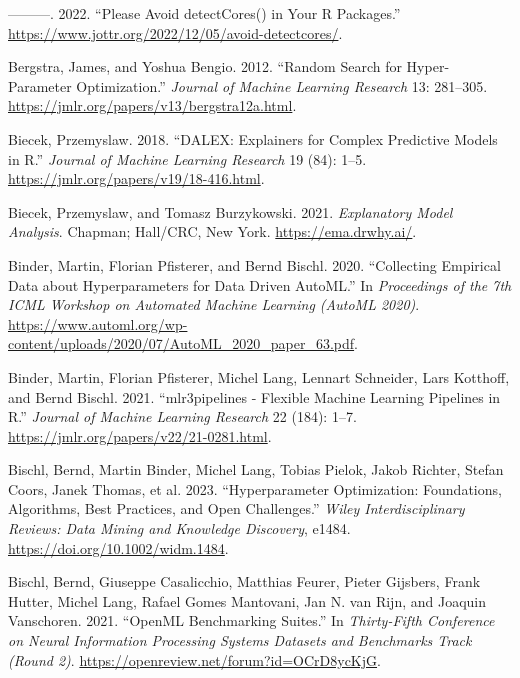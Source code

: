 \begin{CSLReferences}{1}{0}
\leavevmode{}%
---------. 2022. {``Please Avoid detectCores() in Your {R} Packages.''}
\url{https://www.jottr.org/2022/12/05/avoid-detectcores/}.

\leavevmode{}%
Bergstra, James, and Yoshua Bengio. 2012. {``Random Search for
Hyper-Parameter Optimization.''} \emph{Journal of Machine Learning
Research} 13: 281--305.
\url{https://jmlr.org/papers/v13/bergstra12a.html}.

\leavevmode{}%
Biecek, Przemyslaw. 2018. {``{DALEX}: Explainers for Complex Predictive
Models in {R}.''} \emph{Journal of Machine Learning Research} 19 (84):
1--5. \url{https://jmlr.org/papers/v19/18-416.html}.

\leavevmode{}%
Biecek, Przemyslaw, and Tomasz Burzykowski. 2021. \emph{Explanatory
Model Analysis}. Chapman; Hall/CRC, New York.
\url{https://ema.drwhy.ai/}.

\leavevmode{}%
Binder, Martin, Florian Pfisterer, and Bernd Bischl. 2020. {``Collecting
Empirical Data about Hyperparameters for Data Driven AutoML.''} In
\emph{Proceedings of the 7th ICML Workshop on Automated Machine Learning
(AutoML 2020)}.
\url{https://www.automl.org/wp-content/uploads/2020/07/AutoML_2020_paper_63.pdf}.

\leavevmode{}%
Binder, Martin, Florian Pfisterer, Michel Lang, Lennart Schneider, Lars
Kotthoff, and Bernd Bischl. 2021. {``{mlr3pipelines} - Flexible Machine
Learning Pipelines in {R}.''} \emph{Journal of Machine Learning
Research} 22 (184): 1--7.
\url{https://jmlr.org/papers/v22/21-0281.html}.

\leavevmode{}%
Bischl, Bernd, Martin Binder, Michel Lang, Tobias Pielok, Jakob Richter,
Stefan Coors, Janek Thomas, et al. 2023. {``Hyperparameter Optimization:
Foundations, Algorithms, Best Practices, and Open Challenges.''}
\emph{Wiley Interdisciplinary Reviews: Data Mining and Knowledge
Discovery}, e1484. \url{https://doi.org/10.1002/widm.1484}.

\leavevmode{}%
Bischl, Bernd, Giuseppe Casalicchio, Matthias Feurer, Pieter Gijsbers,
Frank Hutter, Michel Lang, Rafael Gomes Mantovani, Jan N. van Rijn, and
Joaquin Vanschoren. 2021. {``Open{ML} Benchmarking Suites.''} In
\emph{Thirty-Fifth Conference on Neural Information Processing Systems
Datasets and Benchmarks Track (Round 2)}.
\url{https://openreview.net/forum?id=OCrD8ycKjG}.


\end{CSLReferences}
